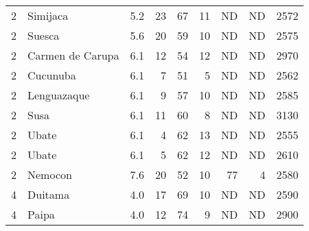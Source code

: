 \documentclass[12pt]{iopart}
\begin{document}
\begin{table}
\begin{tabular}{rlrrrrrrr}
              2 &                     Simijaca &            5.2 &                        23 &                        67 &                   11 &                        ND &                          ND &    2572 \\
              2 &                       Suesca &            5.6 &                        20 &                        59 &                   10 &                        ND &                          ND &    2575 \\
              2 &             Carmen de Carupa &            6.1 &                        12 &                        54 &                   12 &                        ND &                          ND &    2970 \\
              2 &                     Cucunuba &            6.1 &                         7 &                        51 &                    5 &                        ND &                          ND &    2562 \\
              2 &                  Lenguazaque &            6.1 &                         9 &                        57 &                   10 &                        ND &                          ND &    2585 \\
              2 &                         Susa &            6.1 &                        11 &                        60 &                    8 &                        ND &                          ND &    3130 \\
              2 &  Ubate &            6.1 &                         4 &                        62 &                   13 &                        ND &                          ND &    2555 \\
              2 &  Ubate &            6.1 &                         5 &                        62 &                   12 &                        ND &                          ND &    2610 \\
              2 &                      Nemocon &            7.6 &                        20 &                        52 &                   10 &                        77 &                           4 &    2580 \\
              \midrule
              4 &                      Duitama &            4.0 &                        17 &                        69 &                   10 &                        ND &                          ND &    2590 \\
              4 &                        Paipa &            4.0 &                        12 &                        74 &                    9 &                        ND &                          ND &    2900 \\

\end{tabular}
\end{table}
\end{document}
